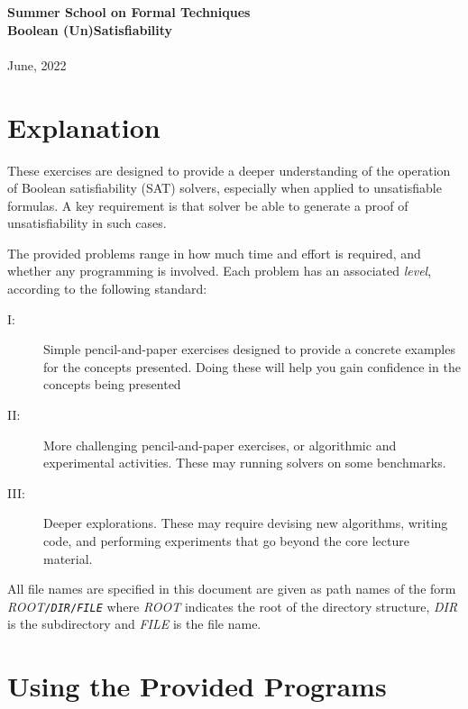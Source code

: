 
\usepackage[pdftex]{graphicx}


\usepackage{exercise}
\usepackage{enumitem}
\usepackage{color}
\usepackage{booktabs}

\newcommand{\pathname}[2]{\textit{ROOT}\texttt{/}\texttt{#1}\texttt{/}\texttt{#2}}


\begin{center}
{\LARGE\bf Summer School on Formal Techniques\\ [1.5 ex]
Boolean (Un)Satisfiability \\[2ex]
}\\ [2 ex]
June, 2022
\end{center}
\section*{Explanation}

These exercises are designed to provide a deeper understanding of the
operation of Boolean satisfiability (SAT) solvers, especially when
applied to unsatisfiable formulas.  A key requirement is that solver
be able to generate a proof of unsatisfiability in such cases.

The provided problems range in how much time and effort is required,
and whether any programming is involved.  Each problem has an
associated {\em level}, according to the following standard:
\begin{description}
\item[I:] Simple pencil-and-paper exercises designed to provide a
  concrete examples for the concepts presented.  Doing these will
  help you gain confidence in the concepts being presented
\item[II:] More challenging pencil-and-paper exercises, or algorithmic
  and experimental activities.  These may running solvers on some
  benchmarks.
\item[III:] Deeper explorations.  These may require devising new
  algorithms, writing code, and performing experiments that go beyond
  the core lecture material.
\end{description}

All file names are specified in this document are given as path names
of the form
\pathname{\textit{DIR}}{\textit{FILE}}
where
\textit{ROOT} indicates the root of the directory structure,
\textit{DIR} is the subdirectory
and \textit{FILE} is the file name.


\newpage

\section*{Using the Provided Programs}

